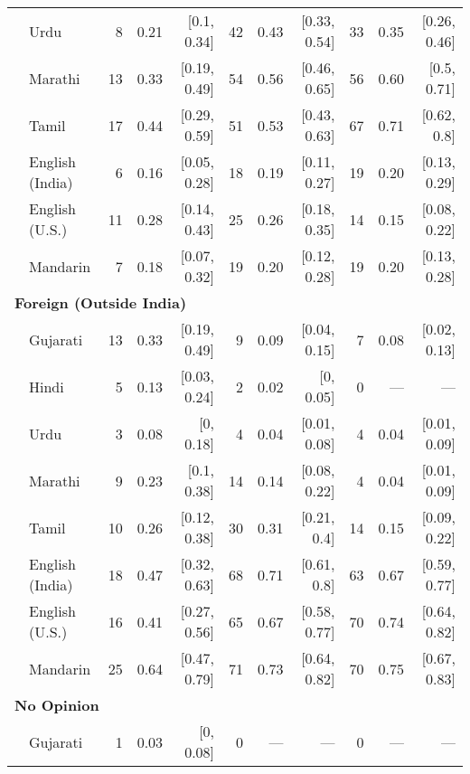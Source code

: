 \begin{table}[t]
\begin{footnotesize}
\begin{tabular}{p{.1in}lrrrrrrrrr}
 & Urdu & 8 & 0.21 & [0.1, 0.34] & 42 & 0.43 & [0.33, 0.54] & 33 & 0.35 & [0.26, 0.46]\\

 & Marathi & 13 & 0.33 & [0.19, 0.49] & 54 & 0.56 & [0.46, 0.65] & 56 & 0.60 & [0.5, 0.71]\\

 & Tamil & 17 & 0.44 & [0.29, 0.59] & 51 & 0.53 & [0.43, 0.63] & 67 & 0.71 & [0.62, 0.8]\\

 & English (India) & 6 & 0.16 & [0.05, 0.28] & 18 & 0.19 & [0.11, 0.27] & 19 & 0.20 & [0.13, 0.29]\\

 & English (U.S.) & 11 & 0.28 & [0.14, 0.43] & 25 & 0.26 & [0.18, 0.35] & 14 & 0.15 & [0.08, 0.22]\\

& Mandarin & 7 & 0.18 & [0.07, 0.32] & 19 & 0.20 & [0.12, 0.28] & 19 & 0.20 & [0.13, 0.28]\\

\midrule
\multicolumn{11}{l}{\textbf{Foreign (Outside India)}}\\
& Gujarati & 13 & 0.33 & [0.19, 0.49] & 9 & 0.09 & [0.04, 0.15] & 7 & 0.08 & [0.02, 0.13]\\

 & Hindi & 5 & 0.13 & [0.03, 0.24] & 2 & 0.02 & [0, 0.05] & 0 & --- & ---\\

 & Urdu & 3 & 0.08 & [0, 0.18] & 4 & 0.04 & [0.01, 0.08] & 4 & 0.04 & [0.01, 0.09]\\

 & Marathi & 9 & 0.23 & [0.1, 0.38] & 14 & 0.14 & [0.08, 0.22] & 4 & 0.04 & [0.01, 0.09]\\

 & Tamil & 10 & 0.26 & [0.12, 0.38] & 30 & 0.31 & [0.21, 0.4] & 14 & 0.15 & [0.09, 0.22]\\

 & English (India) & 18 & 0.47 & [0.32, 0.63] & 68 & 0.71 & [0.61, 0.8] & 63 & 0.67 & [0.59, 0.77]\\

 & English (U.S.) & 16 & 0.41 & [0.27, 0.56] & 65 & 0.67 & [0.58, 0.77] & 70 & 0.74 & [0.64, 0.82]\\

& Mandarin & 25 & 0.64 & [0.47, 0.79] & 71 & 0.73 & [0.64, 0.82] & 70 & 0.75 & [0.67, 0.83]\\

\midrule
\multicolumn{11}{l}{\textbf{No Opinion}}\\
& Gujarati & 1 & 0.03 & [0, 0.08] & 0 & --- & --- & 0 & --- & ---\\


\end{tabular}
\end{footnotesize}
\end{table}
